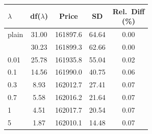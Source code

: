 \begin{table}[h]
\begin{minipage}[t]{0.48\textwidth}
\begin{tabular}[t]{lcccc}
\toprule
$\lambda$ & df($\lambda$) & Price & SD & \shortstack{Rel.\ Diff\\(\%)}\\
\midrule
plain & 31.00 & 161897.6 & 64.64 & 0.00\\
\addlinespace
0.001 & 30.23 & 161899.3 & 62.66 & 0.00\\
0.01 & 25.78 & 161935.8 & 55.04 & 0.02\\
0.1 & 14.56 & 161990.0 & 40.75 & 0.06\\
0.3 & 8.93 & 162012.7 & 27.41 & 0.07\\
0.7 & 5.58 & 162016.2 & 21.64 & 0.07\\
1 & 4.51 & 162017.7 & 20.54 & 0.07\\
5 & 1.87 & 162010.1 & 14.48 & 0.07\\
\bottomrule
\end{tabular}
\end{minipage}
\end{table}

